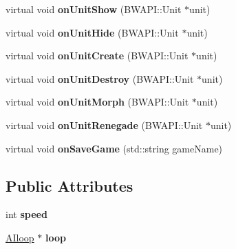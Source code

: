 \begin{DoxyCompactItemize}
\item 
\hypertarget{class_b_t_h_a_i_module_a5bd6a6df075e90658a3c702c97331294}{virtual void {\bfseries on\-Unit\-Show} (B\-W\-A\-P\-I\-::\-Unit $\ast$unit)}\label{class_b_t_h_a_i_module_a5bd6a6df075e90658a3c702c97331294}

\item 
\hypertarget{class_b_t_h_a_i_module_a2ee1c0cd8bdf3de7ed9815c88d67d57a}{virtual void {\bfseries on\-Unit\-Hide} (B\-W\-A\-P\-I\-::\-Unit $\ast$unit)}\label{class_b_t_h_a_i_module_a2ee1c0cd8bdf3de7ed9815c88d67d57a}

\item 
\hypertarget{class_b_t_h_a_i_module_a9ad89a15080118a35df9726efd9f64e6}{virtual void {\bfseries on\-Unit\-Create} (B\-W\-A\-P\-I\-::\-Unit $\ast$unit)}\label{class_b_t_h_a_i_module_a9ad89a15080118a35df9726efd9f64e6}

\item 
\hypertarget{class_b_t_h_a_i_module_a5a098107720d63a853234c68347b394a}{virtual void {\bfseries on\-Unit\-Destroy} (B\-W\-A\-P\-I\-::\-Unit $\ast$unit)}\label{class_b_t_h_a_i_module_a5a098107720d63a853234c68347b394a}

\item 
\hypertarget{class_b_t_h_a_i_module_a8226cceba19ab2d11d2cddaa53c38ac2}{virtual void {\bfseries on\-Unit\-Morph} (B\-W\-A\-P\-I\-::\-Unit $\ast$unit)}\label{class_b_t_h_a_i_module_a8226cceba19ab2d11d2cddaa53c38ac2}

\item 
\hypertarget{class_b_t_h_a_i_module_a17d23d8b032c160d3b5a859cc83d090a}{virtual void {\bfseries on\-Unit\-Renegade} (B\-W\-A\-P\-I\-::\-Unit $\ast$unit)}\label{class_b_t_h_a_i_module_a17d23d8b032c160d3b5a859cc83d090a}

\item 
\hypertarget{class_b_t_h_a_i_module_aca0dd29edde27e4b70660b8ba47f81aa}{virtual void {\bfseries on\-Save\-Game} (std\-::string game\-Name)}\label{class_b_t_h_a_i_module_aca0dd29edde27e4b70660b8ba47f81aa}

\end{DoxyCompactItemize}
\subsection*{Public Attributes}
\begin{DoxyCompactItemize}
\item 
\hypertarget{class_b_t_h_a_i_module_a8248cedfa6955a3afa7cf9a0d412ee31}{int {\bfseries speed}}\label{class_b_t_h_a_i_module_a8248cedfa6955a3afa7cf9a0d412ee31}

\item 
\hypertarget{class_b_t_h_a_i_module_a83e575cc8e69434c49a16fd3403719b9}{\hyperlink{class_a_iloop}{A\-Iloop} $\ast$ {\bfseries loop}}\label{class_b_t_h_a_i_module_a83e575cc8e69434c49a16fd3403719b9}

\end{DoxyCompactItemize}


